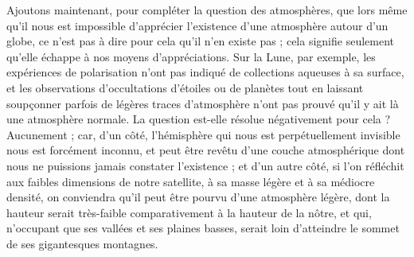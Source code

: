 \documentclass[a4paper, 11pt, oneside, landscape]{article}
\begin{document}
Ajoutons maintenant, pour compléter la question des atmosphères, que lors même qu'il nous est impossible d'apprécier l'existence d'une atmosphère autour d'un globe, ce n'est pas à dire pour cela qu'il n'en existe pas ; cela signifie seulement qu'elle échappe à nos moyens d'appréciations. Sur la Lune, par exemple, les expériences de polarisation n'ont pas indiqué de collections aqueuses à sa surface, et les observations d'occultations d'étoiles ou de planètes tout en laissant soupçonner parfois de légères traces d'atmosphère n'ont pas prouvé qu'il y ait là une atmosphère normale. La question est-elle résolue négativement pour cela ? Aucunement ; car, d'un côté, l'hémisphère qui nous est perpétuellement invisible nous est forcément inconnu, et peut être revêtu d'une couche atmosphérique dont nous ne puissions jamais constater l'existence ; et d'un autre côté, si l'on réfléchit aux faibles dimensions de notre satellite, à sa masse légère et à sa médiocre densité, on conviendra qu'il peut être pourvu d'une atmosphère légère, dont la hauteur serait très-faible comparativement à la hauteur de la nôtre, et qui, n'occupant que ses vallées et ses plaines basses, serait loin d'atteindre le sommet de ses gigantesques montagnes.
\end{document}
